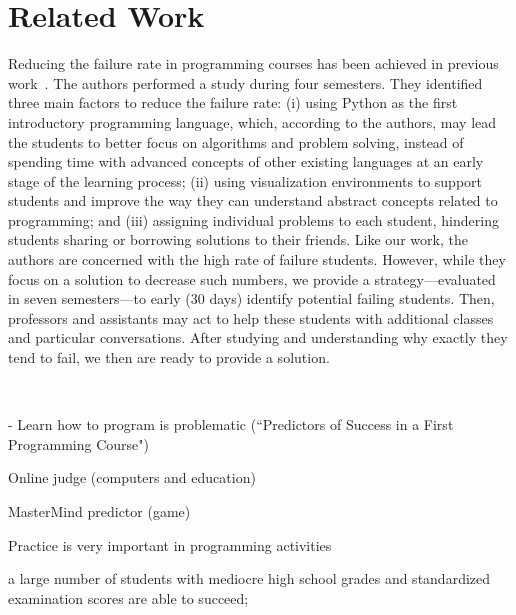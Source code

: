 \section{Related Work}

\label{sec:related}

Reducing the failure rate in programming courses has been achieved in previous work~\cite{}. The authors performed a study during four semesters. They identified three main factors to reduce the failure rate: (i) using Python as the first introductory programming language, which, according to the authors, may lead the students to better focus on algorithms and problem solving, instead of spending time with advanced concepts of other existing languages at an early stage of the learning process; (ii) using visualization environments to support students and improve the way they can understand abstract concepts related to programming; and (iii) assigning individual problems to each student, hindering students sharing or borrowing solutions to their friends. Like our work, the authors are concerned with the high rate of failure students. However, while they focus on a solution to decrease such numbers, we provide a strategy---evaluated in seven semesters---to early (30 days) identify potential failing students. Then, professors and assistants may act to help these students with additional classes and particular conversations. After studying and understanding why exactly they tend to fail, we then are ready to provide a solution.  

~\cite{camel-2006}

- Learn how to program is problematic (``Predictors of Success in a First Programming Course")~\cite{simon-predictors-ace2006}

Online judge (computers and education)~\cite{cheang-online-judge-2003}

MasterMind predictor (game)~\cite{lorenzenC06-mastermind-predictor-sigcse2008}

Practice is very important in programming activities~\cite{on-automated-grading}

a large number of students with mediocre high school grades and standardized examination scores are able to succeed;~\cite{butcher-predictor-high-school-1985}